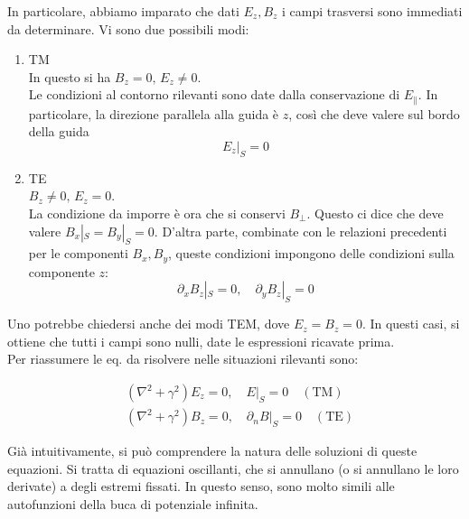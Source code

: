 \documentclass{report}
\begin{document}
    In particolare, abbiamo imparato che dati $E_z, B_z$ i campi trasversi sono immediati da determinare. Vi sono due possibili modi: 
    \begin{enumerate}
        \item TM \\ In questo si ha $B_z =0, \, E_z \neq 0$. \\
        Le condizioni al contorno rilevanti sono date dalla conservazione di $E_{\parallel}$. In particolare, la direzione parallela alla guida è $z$, così che deve valere sul bordo della guida 
        \begin{equation}
            E_z |_{S} = 0 
        \end{equation}
        \item TE \\ $B_z \neq 0, \, E_z = 0 $. \\
        La condizione da imporre è ora che si conservi $B_{\perp}$. Questo ci dice che deve valere $B_x|_S = B_y|_S = 0$. D'altra parte, combinate con le relazioni precedenti per le componenti $B_x, B_y$, queste condizioni impongono delle condizioni sulla componente $z$: 
        \begin{equation}
            \partial_xB_z|_S = 0, \quad \partial_yB_z|_S = 0
        \end{equation}
    \end{enumerate}

    Uno potrebbe chiedersi anche dei modi TEM, dove $E_z = B_z = 0$. In questi casi, si ottiene che tutti i campi sono nulli, date le espressioni ricavate prima. \\

    Per riassumere le eq. da risolvere nelle situazioni rilevanti sono: 

    \begin{tcolorbox}[colback=doc!15, colframe=black, boxrule=1pt]
    \begin{align}
        &(\nabla^2 + \gamma^2)E_z = 0, \quad E|_S = 0 \quad (\text{TM})\\ &(\nabla^2 + \gamma^2)B_z = 0, \quad \partial_nB|_S = 0 \quad (\text{TE}) 
    \end{align}
    \end{tcolorbox}

    Già intuitivamente, si può comprendere la natura delle soluzioni di queste equazioni. Si tratta di equazioni oscillanti, che si annullano (o si annullano le loro derivate) a degli estremi fissati. In questo senso, sono molto simili alle autofunzioni della buca di potenziale infinita. \\
\end{document}
